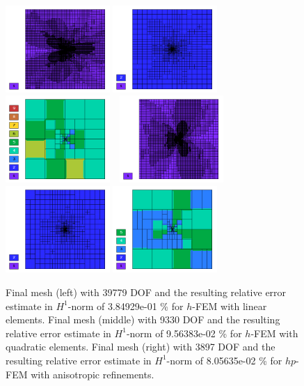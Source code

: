 \documentclass[12pt]{elsarticle}
\begin{document}
\begin{figure}[H]
\centering
\includegraphics[height=3.3cm]{nist/nist-3/mesh_u_h1_aniso.png}
\includegraphics[height=3.3cm]{nist/nist-3/mesh_u_h2_aniso.png}
\includegraphics[height=3.3cm]{nist/nist-3/mesh_u_hp_anisoh.png}\ \
\includegraphics[height=3.3cm]{nist/nist-3/mesh_v_h1_aniso.png}
\includegraphics[height=3.3cm]{nist/nist-3/mesh_v_h2_aniso.png}
\includegraphics[height=3.3cm]{nist/nist-3/mesh_v_hp_anisoh.png}
\caption{
Final mesh (left) with 39779 DOF and the resulting
relative error estimate in $H^1$-norm of 3.84929e-01 \% for $h$-FEM with linear elements.
Final mesh (middle) with 9330 DOF and the resulting
relative error estimate in $H^1$-norm of 9.56383e-02 \% for $h$-FEM with quadratic elements.
Final mesh (right) with 3897 DOF and the resulting
relative error estimate in $H^1$-norm of 8.05635e-02 \% for $hp$-FEM with anisotropic refinements.}
\label{fig:nist-3-hp-aniso}
\end{figure}
\end{document}
